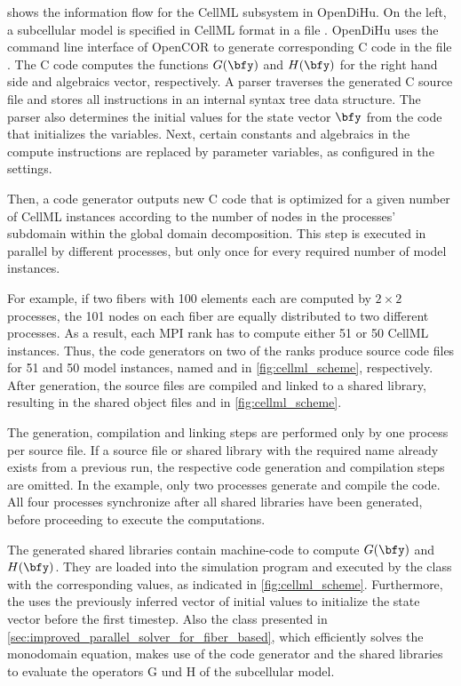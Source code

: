  shows the information flow for the CellML subsystem in OpenDiHu. On the left, a subcellular model is specified in CellML format in a file . OpenDiHu uses the command line interface of OpenCOR to generate corresponding C code in the file . The C code computes the functions $G(\bfy)$ and $H(\bfy)$ for the right hand side and algebraics vector, respectively. A parser traverses the generated C source file and stores all instructions in an internal syntax tree data structure. The parser also determines the initial values for the state vector $\bfy$ from the code that initializes the variables.
Next, certain constants and algebraics in the compute instructions are replaced by parameter variables, as configured in the settings.

Then, a code generator outputs new C code that is optimized for a given number of CellML instances according to the number of nodes in the processes' subdomain within the global domain decomposition. 
This step is executed in parallel by different processes, but only once for every required number of model instances.

For example, if two fibers with 100 elements each are computed by $2 \times 2$ processes, the 101 nodes on each fiber are equally distributed to two different processes. As a result, each MPI rank has to compute either 51 or 50 CellML instances. Thus, the code generators on two of the ranks produce source code files for 51 and 50 model instances, named  and  in \cref{fig:cellml_scheme}, respectively. After generation, the source files are compiled and linked to a shared library, resulting in the shared object files  and  in \cref{fig:cellml_scheme}.

The generation, compilation and linking steps are performed only by one process per source file.
If a source file or shared library with the required name already exists from a previous run, the respective code generation and compilation steps are omitted.
In the example, only two processes generate and compile the code. All four processes synchronize after all shared libraries have been generated, before proceeding to execute the computations.

The generated shared libraries contain machine-code to compute $G(\bfy)$ and $H(\bfy)$. They are loaded into the simulation program and executed by the  class with the corresponding values, as indicated in \cref{fig:cellml_scheme}. Furthermore, the  uses the previously inferred vector of initial values to initialize the state vector before the first timestep. Also the  class presented in \cref{sec:improved_parallel_solver_for_fiber_based}, which efficiently solves the monodomain equation, makes use of the code generator and the shared libraries to evaluate the operators G und H of the subcellular model.

